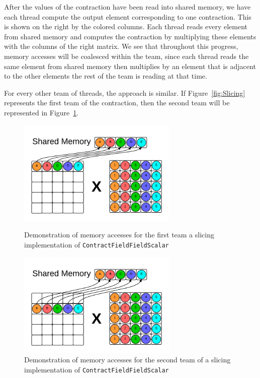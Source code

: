     After the values of the contraction have been read into shared memory, we
have each thread compute the output element corresponding to one contraction.
This is shown on the right by the colored columns. Each thread reads every
element from shared memory and computes the contraction by multiplying these
elements with the columns of the right matrix. We see that throughout this
progress, memory accesses will be coalesced within the team, since each thread
reads the same element from shared memory then multiplies by an element that is
adjacent to the other elements the rest of the team is reading at that time. 
	
    For every other team of threads, the approach is similar. If Figure~\ref{fig:Slicing}
represents the first team of the contraction, then the second team will be
represented in Figure~\ref{fig:Slicing2}. 

\begin{figure}[H]
    \centering
    \includegraphics[width=3in]{ContractFieldFieldScalarGraphic}
    \caption[Memory accesses -- slicing]{Demonstration of memory accesses for the first team a slicing
        implementation of \texttt{ContractFieldFieldScalar}}
    \label{fig:Slicing}

    \includegraphics[width=3in]{ContractFieldFieldScalarGraphic2}
    \caption[Memory accesses -- slicing]{Demonstration of memory accesses for
    the second team of a slicing implementation of
    \texttt{ContractFieldFieldScalar}}
    \label{fig:Slicing2}
\end{figure}

